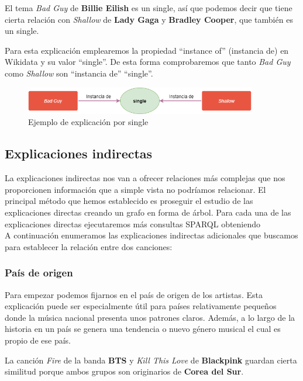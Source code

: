 El tema \textit{Bad Guy} de \textbf{Billie Eilish} es un single, así que podemos decir que tiene cierta relación con \textit{Shallow} de \textbf{Lady Gaga} y \textbf{Bradley Cooper}, que también es un single.

Para esta explicación emplearemos la propiedad ``instance of'' (instancia de) en Wikidata y su valor ``single''. De esta forma comprobaremos que tanto \textit{Bad Guy} como \textit{Shallow} son ``instancia de'' ``single''.\\

\begin{figure}[h!]
	\centering
	\includegraphics[width = 0.9\textwidth]{Imagenes/Bitmap/Single ejemplo.png}
	\caption{Ejemplo de explicación por single}
	\label{fig:sampleImage}
\end{figure}

\subsection{Explicaciones indirectas}

La explicaciones indirectas nos van a ofrecer relaciones más complejas que nos proporcionen información que a simple vista no podríamos relacionar.
El principal método que hemos establecido es proseguir el estudio de las explicaciones directas creando un grafo en forma de árbol.
Para cada una de las explicaciones directas ejecutaremos más consultas SPARQL obteniendo\\


A continuación enumeramos las explicaciones indirectas adicionales que buscamos para establecer la relación entre dos canciones:

\subsubsection*{País de origen}

Para empezar podemos fijarnos en el país de origen de los artistas. Esta explicación puede ser especialmente útil para países relativamente pequeños donde la música nacional presenta unos patrones claros. Además, a lo largo de la historia en un país se genera una tendencia o nuevo género musical el cual es propio de ese país.

La canción \textit{Fire} de la banda \textbf{BTS} y \textit{Kill This Love} de \textbf{Blackpink} guardan cierta similitud porque ambos grupos son originarios de \textbf{Corea del Sur}.

